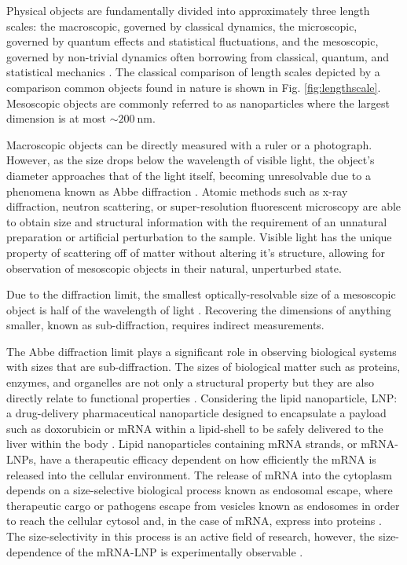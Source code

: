 \setcounter{page}{1}
Physical objects are fundamentally divided into approximately three length scales: the macroscopic, governed by classical dynamics, the microscopic, governed by quantum effects and statistical fluctuations, and the mesoscopic, governed by non-trivial dynamics often borrowing from classical, quantum, and statistical mechanics \cite{imry2002mesoscopic}. The classical comparison of length scales depicted by a comparison common objects found in nature is shown in Fig. \ref{fig:lengthscale}. Mesoscopic objects are commonly referred to as nanoparticles where the largest dimension is at most ${\sim}\SI{200}{\nm}$.

Macroscopic objects can be directly measured with a ruler or a photograph. However, as the size drops below the wavelength of visible light, the object's diameter approaches that of the light itself, becoming unresolvable due to a phenomena known as Abbe diffraction \cite{abbe1873beitraege}. Atomic methods such as x-ray diffraction, neutron scattering, or super-resolution fluorescent microscopy are able to obtain size and structural information with the requirement of an unnatural preparation or artificial perturbation to the sample. Visible light has the unique property of scattering off of matter without altering it's structure, allowing for observation of mesoscopic objects in their natural, unperturbed state.

Due to the diffraction limit, the smallest optically-resolvable size of a mesoscopic object is half of the wavelength of light \cite{Steck2021, Born1999}. Recovering the dimensions of anything smaller, known as sub-diffraction, requires indirect measurements.  

The Abbe diffraction limit plays a significant role in observing biological systems with sizes that are sub-diffraction. The sizes of biological matter such as proteins, enzymes, and organelles are not only a structural property but they are also directly relate to functional properties \cite{Hou2019MoleculesReview}. Considering the lipid nanoparticle, LNP: a drug-delivery pharmaceutical nanoparticle designed to encapsulate a payload such as doxorubicin or mRNA within a lipid-shell to be safely delivered to the liver within the body \cite{hou_lipid_2021}. Lipid nanoparticles containing mRNA strands, or mRNA-LNPs, have a therapeutic efficacy dependent on how efficiently the mRNA is released into the cellular environment. The release of mRNA into the cytoplasm depends on a size-selective biological process known as endosomal escape, where therapeutic cargo or pathogens escape from vesicles known as endosomes in order to reach the cellular cytosol and, in the case of mRNA, express into proteins \cite{ Sahay2013, Gilleron2013, Rejman2004, Zhang2009, Banerjee2016}. The size-selectivity in this process is an active field of research, however, the size-dependence of the mRNA-LNP is experimentally observable \cite{pei_endosomal_2026, 9195130}.

